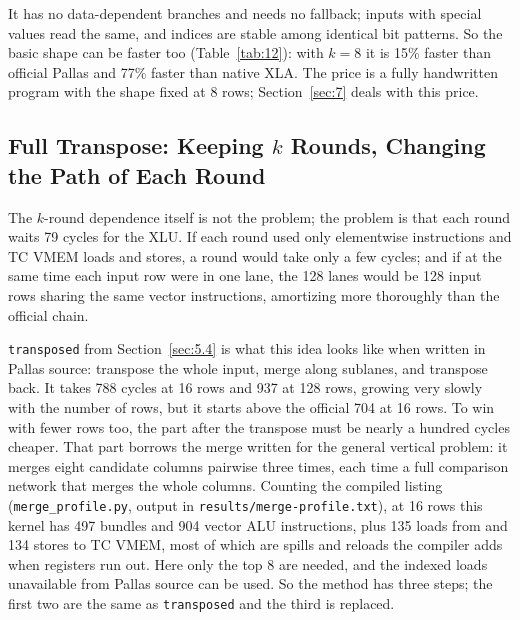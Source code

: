 \documentclass[sigconf,nonacm,balance=false]{acmart}
\newcommand{\code}[1]{\texttt{#1}}
\begin{document}
It has no data-dependent branches and needs no fallback; inputs with special values read the same, and indices are stable among identical bit patterns. So the basic shape can be faster too (Table~\ref{tab:12}): with $k = 8$ it is 15\% faster than official Pallas and 77\% faster than native XLA. The price is a fully handwritten program with the shape fixed at 8 rows; Section~\ref{sec:7} deals with this price.

\subsection{\texorpdfstring{Full Transpose: Keeping $k$ Rounds, Changing the Path of Each Round}{Full Transpose: Keeping k Rounds, Changing the Path of Each Round}}
\label{sec:6.3}

The $k$-round dependence itself is not the problem; the problem is that each round waits 79 cycles for the XLU. If each round used only elementwise instructions and TC VMEM loads and stores, a round would take only a few cycles; and if at the same time each input row were in one lane, the 128 lanes would be 128 input rows sharing the same vector instructions, amortizing more thoroughly than the official chain.

\code{transposed} from Section~\ref{sec:5.4} is what this idea looks like when written in Pallas source: transpose the whole input, merge along sublanes, and transpose back. It takes 788 cycles at 16 rows and 937 at 128 rows, growing very slowly with the number of rows, but it starts above the official 704 at 16 rows. To win with fewer rows too, the part after the transpose must be nearly a hundred cycles cheaper. That part borrows the merge written for the general vertical problem: it merges eight candidate columns pairwise three times, each time a full comparison network that merges the whole columns. Counting the compiled listing (\code{merge\_\allowbreak{}profile.\allowbreak{}py}, output in \code{results/\allowbreak{}merge-profile.\allowbreak{}txt}), at 16 rows this kernel has 497 bundles and 904 vector ALU instructions, plus 135 loads from and 134 stores to TC VMEM, most of which are spills and reloads the compiler adds when registers run out. Here only the top 8 are needed, and the indexed loads unavailable from Pallas source can be used. So the method has three steps; the first two are the same as \code{transposed} and the third is replaced.
\end{document}
